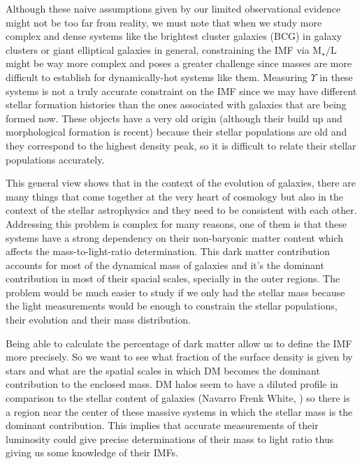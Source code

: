 Although these naive assumptions given by our limited observational evidence might not be too far from reality, we must note that when we study more complex and dense systems like the brightest cluster galaxies (BCG) in galaxy clusters or giant elliptical galaxies in general, constraining the IMF via $\textrm{M}_{\star}/\textrm{L}$ might be way more complex and poses a greater challenge since masses are more difficult to establish for dynamically-hot systems like them. Measuring $\Upsilon$ in these systems is not a truly accurate constraint on the IMF since we may have different stellar formation histories than the ones associated with galaxies that are being formed now. These objects have a very old origin (although their build up and morphological formation is recent) because their stellar populations are old and they correspond to the highest density peak, so it is difficult to relate their stellar populations accurately.

This general view shows that in the context of the evolution of galaxies, there are many things that come together at the very heart of cosmology but also in the context of the stellar astrophysics and they need to be consistent with each other. Addressing this problem is complex for many reasons, one of them is that these systems have a strong dependency on their non-baryonic matter content which affects the mass-to-light-ratio determination. This dark matter contribution accounts for most of the dynamical mass of galaxies and it's the dominant contribution in most of their spacial scales, specially in the outer regions. The problem would be much easier to study if we only had the stellar mass because the light measurements would be enough to constrain the stellar populations, their evolution and their mass distribution. 

Being able to calculate the percentage of dark matter allow us to define the IMF more precisely. So we want to see what fraction of the surface density is given by stars and what are the spatial scales in which DM becomes the dominant contribution to the enclosed mass. DM halos seem to have a diluted profile in comparison to the stellar content of galaxies (Navarro Frenk White, \citeyear{Reference17}) so there is a region near the center of these massive systems in which the stellar mass is the dominant contribution. This implies that accurate measurements of their luminosity could give precise determinations of their mass to light ratio thus giving us some knowledge of their IMFs.

